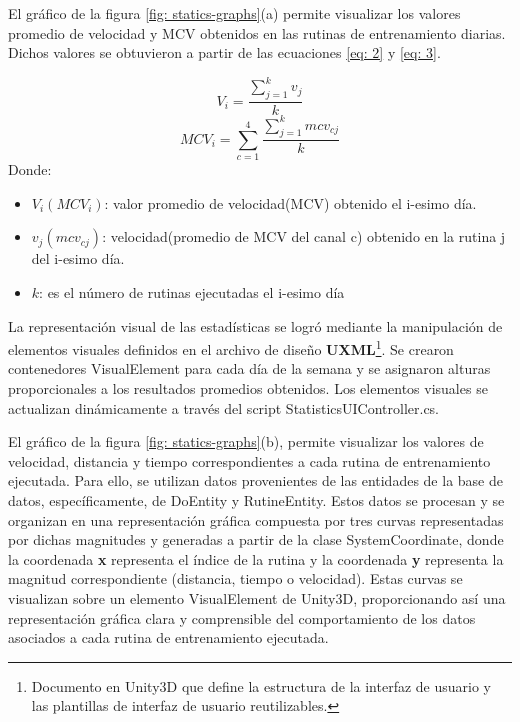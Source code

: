 \newpage
{}
El gráfico de la figura \ref{fig: statics-graphs}(a) permite visualizar los valores promedio de velocidad y MCV obtenidos en las rutinas de entrenamiento diarias. Dichos valores se obtuvieron a partir de las ecuaciones \ref{eq: 2} y \ref{eq: 3}.    

\begin{equation}
    V_{i} = \frac{\sum_{j=1}^{k} v_{j}}{k}
    \label{eq: 2}
    \end{equation}
    \begin{equation}
    MCV_{i} = \sum_{c=1}^{4}\frac{\sum_{j=1}^{k} mcv_{c j}}{k}
    \label{eq: 3}
\end{equation}
Donde:
\begin{itemize}
    \item $V_{i} (MCV_{i})$: valor promedio de velocidad(MCV) obtenido el i-esimo día.
    \item $v_{j}(mcv_{cj})$: velocidad(promedio de MCV del canal c) obtenido en la rutina j del i-esimo día. 
    \item $k$: es el número de rutinas ejecutadas el i-esimo día 
\end{itemize}
La representación visual de las estadísticas se logró mediante la manipulación de elementos visuales definidos en el archivo de diseño \textbf{UXML}\footnote{Documento en Unity3D que define la estructura de la interfaz de usuario y las plantillas de interfaz de usuario reutilizables.}. Se crearon contenedores VisualElement para cada día de la semana y se asignaron alturas proporcionales a los resultados promedios obtenidos. Los elementos visuales se actualizan dinámicamente a través del script StatisticsUIController.cs.

El gráfico de la figura \ref{fig: statics-graphs}(b), permite visualizar los valores de velocidad, distancia y tiempo correspondientes a cada rutina de entrenamiento ejecutada. Para ello, se utilizan datos provenientes de las entidades de la base de datos, específicamente, de DoEntity y RutineEntity. Estos datos se procesan y se organizan en una representación gráfica compuesta por tres curvas representadas por dichas magnitudes y generadas a partir de la clase SystemCoordinate, donde la coordenada \textbf{x} representa el índice de la rutina y la coordenada \textbf{y} representa la magnitud correspondiente (distancia, tiempo o velocidad). Estas curvas  se visualizan sobre un elemento VisualElement de Unity3D, proporcionando así una representación gráfica clara y comprensible del comportamiento de los datos asociados a cada rutina de entrenamiento ejecutada.
    


